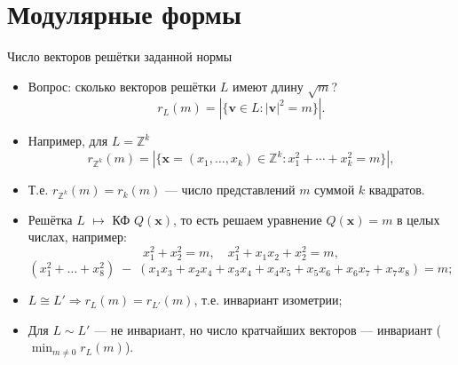 \documentclass[serif, aspectratio=169]{beamer}
\begin{document}
\section{Модулярные формы}

\begin{frame}{Число векторов решётки заданной нормы}
    \begin{itemize}
        \item Вопрос: сколько векторов решётки $L$ имеют длину $\sqrt{m}$?
        \[r_L(m) = \left|\{\mathbf{v} \in L : |\mathbf{v}|^2 = m\}\right|.\]
        \item Например, для $L=\mathbb{Z}^k$ 
        \[r_{\mathbb{Z}^k}(m) = \left|\{\mathbf{x}=(x_1,\dots,x_k)\in\mathbb{Z}^k : x_1^2+\cdots+x_k^2=m\}\right|,\]
        \item Т.е. $r_{\mathbb{Z}^k}(m) = r_k(m)$ --- число представлений $m$ суммой $k$ квадратов.
        \item Решётка $L$ $\mapsto$ КФ $Q(\mathbf{x})$, то есть решаем уравнение $Q(\mathbf{x})=m$ в целых числах, например:
        \[x_1^2+x_2^2=m,\quad x_1^2+x_1x_2+x_2^2=m,\]
        \[(x_1^2+\dots+x_8^2) \;-\; \left(x_1x_3+x_2x_4+x_3x_4+x_4x_5+x_5x_6+x_6x_7+x_7x_8\right) = m;\]
        \item $L\cong L' \Rightarrow r_L(m)=r_{L'}(m)$, т.е. инвариант изометрии;
        \item Для $L\sim L'$ --- не инвариант, но число кратчайших векторов --- инвариант ($\min_{m\neq 0} r_L(m)$).
    \end{itemize}
    \note{
        \begin{itemize}
            \item ---
        \end{itemize}
    }
\end{frame}
\end{document}
